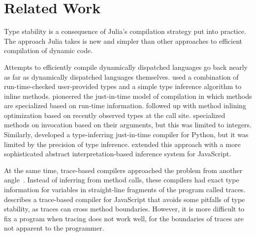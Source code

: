 \documentclass[oneside,openright,titlepage,numbers=noenddot,%
headinclude,footinclude,cleardoublepage=empty,abstract=on,
BCOR=5mm,paper=a4,fontsize=11pt,
dvipsnames
]{scrreprt}
\renewcommand{\c}[1]{\lstinline[language=Julia]!#1!\xspace}
\begin{document}


\section{Related Work}%
\label{sec-related}

Type stability is a consequence of Julia's compilation strategy put into
practice. The approach Julia takes is new and simpler than other approaches to
efficient compilation of dynamic code.

Attempts to efficiently compile dynamically dispatched languages go back nearly
as far as dynamically dispatched languages themselves.
\citet{HurricaneSmalltalk} used a combination of run-time-checked user-provided
types and a simple type inference algorithm to inline methods. \citet{CU89}
pioneered the just-in-time model of compilation in which methods are specialized
based on run-time information. \citet{holzle1994odd} followed up with method
inlining optimization based on recently observed types at the call site.
\citet{Psyco2004} specialized methods on invocation based on their arguments,
but this was limited to integers. Similarly, \citet{cannon2005localized} developed a
type-inferring just-in-time compiler for Python, but it was limited by the
precision of type inference. \citet{RATA} extended this approach with a more
sophisticated abstract interpretation-based inference system for JavaScript.

At the same time, trace-based compilers approached the problem from another
angle~\cite{chang2007efficient}.
Instead of inferring from method calls, these compilers had exact type
information for variables in straight-line fragments of the program called
traces. \citet{gal09} describes a trace-based compiler for JavaScript that avoids
some pitfalls of type stability, as traces can cross method boundaries.
However, it is more difficult to fix a program when tracing does not work well,
for the boundaries of traces are not apparent to the programmer.
\end{document}
